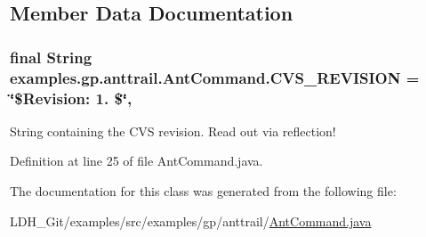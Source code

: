\subsection{Member Data Documentation}
\hypertarget{classexamples_1_1gp_1_1anttrail_1_1_ant_command_a7f6d89fdbe64b14ca611ab0dc419b5d3}{
\subsubsection[{C\-V\-S\-\_\-\-R\-E\-V\-I\-S\-I\-O\-N}]{\setlength{\rightskip}{0pt plus 5cm}final String examples.\-gp.\-anttrail.\-Ant\-Command.\-C\-V\-S\-\_\-\-R\-E\-V\-I\-S\-I\-O\-N = \char`\"{}\$Revision\-: 1. \$\char`\"{}\hspace{0.3cm}{\ttfamily [static]}, {\ttfamily [private]}}}\label{classexamples_1_1gp_1_1anttrail_1_1_ant_command_a7f6d89fdbe64b14ca611ab0dc419b5d3}
String containing the C\-V\-S revision. Read out via reflection! 

Definition at line 25 of file Ant\-Command.\-java.



The documentation for this class was generated from the following file\-:\begin{DoxyCompactItemize}
\item 
L\-D\-H\-\_\-\-Git/examples/src/examples/gp/anttrail/\hyperlink{anttrail_2_ant_command_8java}{Ant\-Command.\-java}\end{DoxyCompactItemize}
